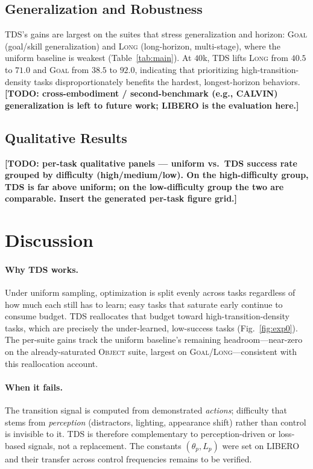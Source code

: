 \documentclass[letterpaper]{article} %
\newcommand{\tds}{TDS}
\begin{document}
\subsection{Generalization and Robustness}
\tds{}'s gains are largest on the suites that stress generalization and horizon: \textsc{Goal} (goal/skill generalization) and \textsc{Long} (long-horizon, multi-stage), where the uniform baseline is weakest (Table~\ref{tab:main}). At $40$k, \tds{} lifts \textsc{Long} from $40.5$ to $71.0$ and \textsc{Goal} from $38.5$ to $92.0$, indicating that prioritizing high-transition-density tasks disproportionately benefits the hardest, longest-horizon behaviors. \textbf{[TODO: cross-embodiment / second-benchmark (e.g., CALVIN) generalization is left to future work; LIBERO is the evaluation here.]}

\subsection{Qualitative Results}
\textbf{[TODO: per-task qualitative panels --- uniform vs.\ \tds{} success rate grouped by difficulty (high/medium/low). On the high-difficulty group, \tds{} is far above uniform; on the low-difficulty group the two are comparable. Insert the generated per-task figure grid.]}

\section{Discussion}
\paragraph{Why TDS works.}
Under uniform sampling, optimization is split evenly across tasks regardless of how much each still has to learn; easy tasks that saturate early continue to consume budget. \tds{} reallocates that budget toward high-transition-density tasks, which are precisely the under-learned, low-success tasks (Fig.~\ref{fig:exp0}). The per-suite gains track the uniform baseline's remaining headroom---near-zero on the already-saturated \textsc{Object} suite, largest on \textsc{Goal}/\textsc{Long}---consistent with this reallocation account.
\paragraph{When it fails.}
The transition signal is computed from demonstrated \emph{actions}; difficulty that stems from \emph{perception} (distractors, lighting, appearance shift) rather than control is invisible to it. \tds{} is therefore complementary to perception-driven or loss-based signals, not a replacement. The constants $(\theta_p,L_p)$ were set on LIBERO and their transfer across control frequencies remains to be verified.
\end{document}
